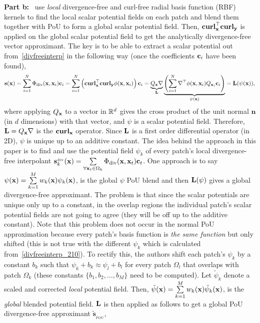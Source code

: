 {\bf Part b:}~\citep{drake2021partition} use \emph{local} divergence-free and curl-free radial basis function (RBF) kernels to find the local scalar potential fields on each patch and blend them together with PoU to form a global scalar potential field. Then, $\textbf{curl}_{\mathbf{x}}^{\top} \textbf{curl}_{\mathbf{y}}$ is applied on the global scalar potential field to get the analytically divergence-free vector approximant. The key is to be able to extract a scalar potential out from~\eqref{divfreeinterp} in the following way (once the coefficients $\mathbf{c}_i$ have been found),
\begin{align}
\mathbf{s}(\mathbf{x}) = \sum\limits_{i=1}^{N} \Phi_{\text{div}}(\mathbf{x}, \mathbf{x}_i) \mathbf{c}_i = \sum\limits_{i=1}^{N} \left(\textbf{curl}_{\mathbf{x}}^{\top} \textbf{curl}_{\mathbf{y}} \phi(\mathbf{x}, \mathbf{x}_i)\right) \mathbf{c}_i = \underbrace{Q_{\mathbf{x}} \nabla}_{\mathbf{L}} \underbrace{\left(\sum\limits_{i=1}^{N} \nabla^{\top} \phi(\mathbf{x}, \mathbf{x}_i) Q_{\mathbf{x}_i} \mathbf{c}_i \right)}_{\psi(\mathbf{x})} = \mathbf{L}(\psi(\mathbf{x})), \label{divfreeinterp_210}
\end{align}
where applying $Q_{\mathbf{x}}$ to a vector in $\mathbb{R}^d$ gives the cross product of the unit normal $\mathbf{n}$ (in $d$ dimensions) with that vector, and $\psi$ is a scalar potential field. Therefore, $\mathbf{L} = Q_{\mathbf{x}} \nabla$ is the $\textbf{curl}_{\mathbf{x}}$ operator. Since $\mathbf{L}$ is a first order differential operator (in 2D), $\psi$ is unique up to an additive constant. The idea behind the approach in this paper is to find and use the potential field $\psi_k$ of every patch's local divergence-free interpolant ${\mathbf{s}_k^{_{\text{div}}}(\mathbf{x}) = \sum\limits_{\forall \mathbf{x}_t \in \Omega_k} \Phi_{\text{div}}(\mathbf{x}, \mathbf{x}_t) \mathbf{c}_t}$. One approach is to say ${\psi(\mathbf{x}) = \sum\limits_{k=1}^{M} w_k(\mathbf{x}) \psi_k(\mathbf{x})}$, is the global $\psi$ PoU blend and then $\mathbf{L}(\psi)$ gives a global divergence-free approximant. The problem is that since the scalar potentials are unique only up to a constant, in the overlap regions the individual patch's scalar potential fields are not going to agree (they will be off up to the additive constant). Note that this problem does not occur in the normal PoU approximation because every patch's basis function is \emph{the same function} but only shifted (this is not true with the different $\psi_k$ which is calculated from~\eqref{divfreeinterp_210}). To rectify this, the authors shift each patch's $\psi_k$ by a constant $b_k$ such that $\psi_k + b_k \approx \psi_l + b_l$ for every patch $\Omega_l$ that overlaps with patch $\Omega_k$ (these constants $\{b_1, b_2, \dots, b_M\}$ need to be computed). Let $\tilde{\psi}_k$ denote a scaled and corrected \emph{local} potential field. Then, ${\tilde{\psi}(\mathbf{x}) = \sum\limits_{k=1}^{M} w_k(\mathbf{x}) \tilde{\psi}_k(\mathbf{x})}$, is the \emph{global} blended potential field. $\mathbf{L}$ is then applied as follows to get a global PoU divergence-free approximant $\tilde{\mathbf{s}}_{_{\text{POU}}}$,
